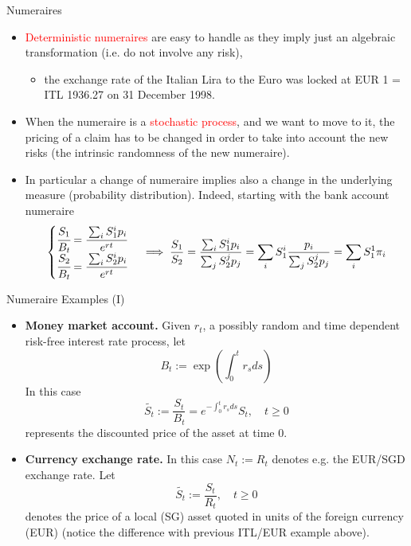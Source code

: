 \documentclass{beamer}
\begin{document}
\begin{frame}{Numeraires}
  \begin{itemize}
  \item<1-> \textcolor{red}{Deterministic numeraires} are easy to handle as they imply just an algebraic transformation (i.e. do not involve any risk),
    \begin{itemize}
    \item the exchange rate of the Italian Lira to the Euro was locked at EUR 1 = ITL 1936.27 on 31 December 1998.
    \end{itemize}
  \item<2-> When the numeraire is a \textcolor{red}{stochastic process}, and we want to move to it, the pricing of a claim has to be changed in order to take into account the new risks (the intrinsic randomness of the new numeraire).
  \item<3-> In particular a change of numeraire implies also a change in the underlying measure (probability distribution). Indeed, starting with the bank account numeraire
    \begin{equation*}
      \begin{cases}
        \cfrac{S_1}{B_t} = \cfrac{\sum_i S^i_1 p_i}{e^{rt}}\\
        \cfrac{S_2}{B_t} = \cfrac{\sum_i S^i_2 p_i}{e^{rt}}
      \end{cases}\implies
      \frac{S_1}{S_2} = \frac{\sum_i S^i_1 p_i}{\sum_j S^j_2 p_j} = \sum_i S_1^i \frac{p_i}{\sum_j S^j_2 p_j} = \sum_i S_1^1 \pi_i
    \end{equation*}
  \end{itemize}
\end{frame}

\begin{frame}{Numeraire Examples (I)}
  \begin{itemize}
  \item<1-> \textbf{Money market account.} Given $r_t$, a possibly random and time dependent risk-free interest rate process, let
    \begin{equation*}
      B_t := \exp\left(\int_0^t r_s ds\right)
    \end{equation*}
    In this case 
    \begin{equation*}
      \tilde{S_t}:=\frac{S_t}{B_t}=e^{-\int_0^t r_s ds}S_t, \quad t \ge 0
    \end{equation*}
    represents the discounted price of the asset at time 0.
  \item<2-> \textbf{Currency exchange rate.} In this case $N_t := R_t$ denotes e.g. the EUR/SGD exchange rate. Let
    \begin{equation*}
      \tilde{S_t}:=\frac{S_t}{R_t}, \quad t \ge 0
    \end{equation*}
    denotes the price of a local (SG) asset quoted in units of the foreign currency (EUR) (notice the difference with previous ITL/EUR example above).
  \end{itemize}
\end{frame}
\end{document}
